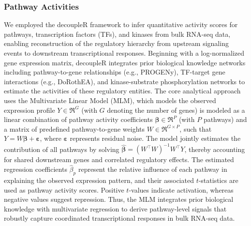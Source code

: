 \documentclass[pdflatex,article,12pt]{article}
\begin{document}
\subsubsection{Pathway Activities}

We employed the decoupleR \citep{badia2022decoupler} framework to infer quantitative activity scores for pathways, transcription factors (TFs), and kinases from bulk RNA-seq data, enabling reconstruction of the regulatory hierarchy from upstream signaling events to downstream transcriptional responses. Beginning with a log-normalized gene expression matrix, decoupleR integrates prior biological knowledge networks including pathway-to-gene relationships (e.g., PROGENy), TF-target gene interactions (e.g., DoRothEA), and kinase-substrate phosphorylation networks to estimate the activities of these regulatory entities. The core analytical approach uses the Multivariate Linear Model (MLM), which models the observed expression profile $Y \in \Re^G$ (with $G$ denoting the number of genes) is modeled as a linear combination of pathway activity coefficients $\boldsymbol{\beta} \in \Re^P$ (with $P$ pathways) and a matrix of predefined pathway-to-gene weights $W \in \Re^{G \times P}$, such that
$Y = W\boldsymbol{\beta} + \boldsymbol{\varepsilon}$, where $\boldsymbol{\varepsilon}$ represents residual noise. The model jointly estimates the contribution of all pathways by solving $\hat{\boldsymbol{\beta}} = (W^\top W)^{-1} W^\top Y$, thereby accounting for shared downstream genes and correlated regulatory effects. The estimated regression coefficients $\hat{\beta}_p$ represent the relative influence of each pathway in explaining the observed expression pattern, and their associated $t$-statistics are used as pathway activity scores. Positive $t$-values indicate activation, whereas negative values suggest repression. Thus, the MLM integrates prior biological knowledge with multivariate regression to derive pathway-level signals that robustly capture coordinated transcriptional responses in bulk RNA-seq data.
\end{document}
